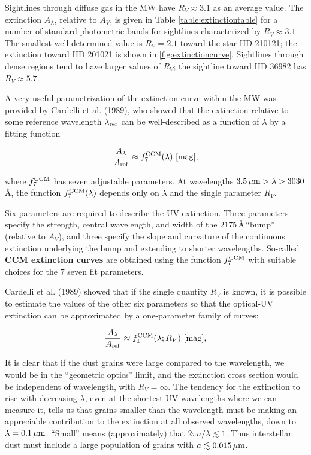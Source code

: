 \documentclass[a4paper,10pt]{article}
\begin{document}
{\noindent}Sightlines through diffuse gas in the MW have $R_V\approx3.1$ as an average value. The extinction $A_\lambda$, relative to $A_V$, is given in Table \ref{table:extinctiontable} for a number of standard photometric bands for sightlines characterized by $R_V\approx3.1$. The smallest well-determined value is $R_V=2.1$ toward the star HD 210121; the extinction toward HD 201021 is shown in \ref{fig:extinctioncurve}. Sightlines through dense regions tend to have larger values of $R_V$; the sightline toward HD 36982 has $R_V\approx5.7$.

{\noindent}A very useful parametrization of the extinction curve within the MW was provided by Cardelli et al. (1989), who showed that the extinction relative to some reference wavelength $\lambda_{\rm ref}$ can be well-described as a function of $\lambda$ by a fitting function

\begin{align*}
    \frac{A_\lambda}{A_{\rm ref}} \approx f_7^{\rm CCM}(\lambda) ~ [{\rm mag}],
\end{align*}

{\noindent}where $f_7^{\rm CCM}$ has seven adjustable parameters. At wavelengths $3.5\,\mu{\rm m}>\lambda>3030$\,\AA, the function $f_7^{\rm CCM}(\lambda)$ depends only on $\lambda$ and the single parameter $R_V$.

{\noindent}Six parameters are required to describe the UV extinction. Three parameters specify the strength, central wavelength, and width of the $2175$\,\AA\,``bump'' (relative to $A_V$), and three specify the slope and curvature of the continuous extinction underlying the bump and extending to shorter wavelengths. So-called \textbf{CCM extinction curves} are obtained using the function $f_7^{\rm CCM}$ with suitable choices for the $7$ seven fit parameters.

{\noindent}Cardelli et al. (1989) showed that if the single quantity $R_V$ is known, it is possible to estimate the values of the other six parameters so that the optical-UV extinction can be approximated by a one-parameter family of curves:

\begin{align*}
    \frac{A_\lambda}{A_{\rm ref}} \approx f_1^{\rm CCM}(\lambda;R_V) ~ [{\rm mag}],
\end{align*}

{\noindent}It is clear that if the dust grains were large compared to the wavelength, we would be in the ``geometric optics'' limit, and the extinction cross section would be independent of wavelength, with $R_V=\infty$. The tendency for the extinction to rise with decreasing $\lambda$, even at the shortest UV wavelengths where we can measure it, tells us that grains smaller than the wavelength must be making an appreciable contribution to the extinction at all observed wavelengths, down to $\lambda=0.1\,\mu{\rm m}$. ``Small'' means (approximately) that $2\pi a/\lambda\lesssim1$. Thus interstellar dust must include a large population of grains with $a\lesssim0.015\,\mu{\rm m}$.
\end{document}
